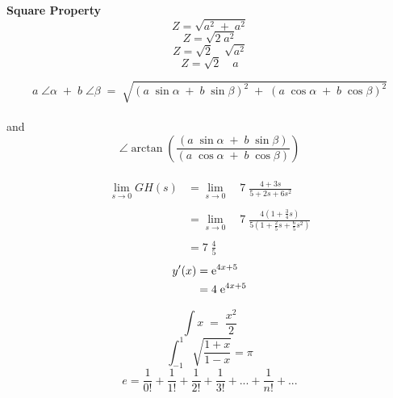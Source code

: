\begin{minipage}[H]{0.3\linewidth}
	\textbf{Square Property} \\
	\[Z=\sqrt{a^2 \; + \; a^2}\]
	\[Z=\sqrt{2 \; a^2}\]
	\[Z=\sqrt{2} \quad \sqrt{a^2}\]
	\[Z=\sqrt{2} \quad a\]
\end{minipage}
\minipagespace{1cm}
\[a \; \angle \alpha \; + \; b \; \angle \beta \; = \; \sqrt{(a \;  \sin \alpha \; + \; b \; \sin \beta)^2 \; + \; (a \; \cos \alpha \; + \; b \; \cos \beta)^2}\] \\
and \\
\[\angle \arctan(\frac{(a \; \sin \alpha \; + \; b \; \sin \beta)}{(a \; \cos \alpha \; + \; b \; \cos \beta)})\] \\
\begin{align*}
	\lim_{s \to 0}{GH(s)} & = \lim_{s \to 0} \quad 7 \; \frac{4+3s}{5+2s+6s^2} \\ \\
	& = \lim_{s \to 0} \quad 7 \; \frac{4(1+\frac{3}{4}s)}{5(1+\frac{2}{5}s+\frac{6}{5}s^2)} \\ \\
	& = 7 \; \frac{4}{5}
\end{align*}
\begin{align*}
	y'(x) &= \mathrm{e}^{4x+5} \\
	&= 4 \; \mathrm{e}^{4x+5}
\end{align*}
\emptyline

\newpage

\newpage
\[\int x \; = \; \frac{x^2}{2}\]
\[\int_{-1}^{1}\sqrt{\frac{1+x}{1-x}}=\pi\]
\[e=\frac{1}{0!}+\frac{1}{1!}+\frac{1}{2!}+\frac{1}{3!}+...+\frac{1}{n!}+...\]
\newpage
